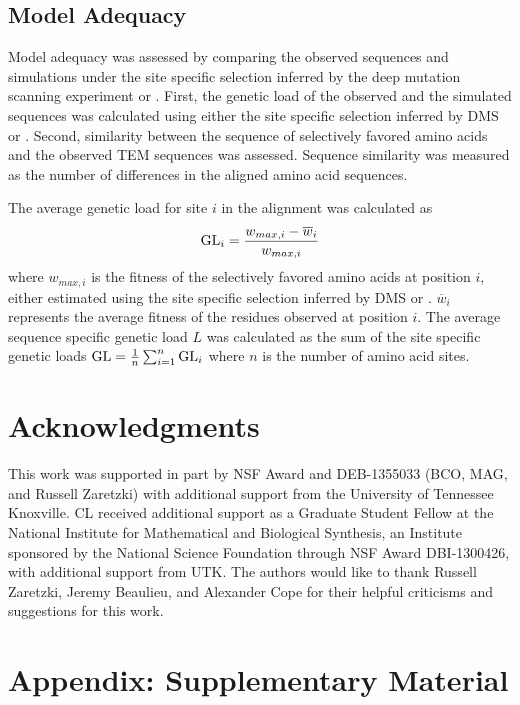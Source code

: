 \subsection{Model Adequacy}

Model adequacy was assessed by comparing the observed sequences and simulations under the site specific selection inferred by the deep mutation scanning experiment or \selac.
First, the genetic load of the observed and the simulated sequences was calculated using either the site specific selection inferred by DMS or \selac.
Second, similarity between the sequence of selectively favored amino acids and the observed TEM sequences was assessed.
Sequence similarity was measured as the number of differences in the aligned amino acid sequences.

The average genetic load for site $i$ in the alignment was calculated as
\begin{equation}
\text{GL}_i = \frac{w_{max,i} - \overline{w}_i}{w_{max,i}}
\end{equation}
where $w_{max,i}$ is the fitness of the selectively favored amino acids at position $i$, either estimated using the site specific selection inferred by DMS or \selac.
$\overline{w}_i$ represents the average fitness of the residues observed at position $i$.
The average sequence specific genetic load $L$ was calculated as the sum of the site specific genetic loads $\text{GL} = \frac{1}{n}\sum_{i=1}^n \text{GL}_i$ where $n$ is the number of amino acid sites.

\section{Acknowledgments}
This work was supported in part by NSF Award and DEB-1355033 (BCO, MAG, and Russell Zaretzki) with additional support from the University of Tennessee Knoxville. 
CL received additional support as a Graduate Student Fellow at the National Institute for Mathematical and Biological Synthesis, an Institute sponsored by the National Science Foundation through NSF Award DBI-1300426, with additional support from UTK. 
The authors would like to thank Russell Zaretzki, Jeremy Beaulieu, and Alexander Cope for their helpful criticisms and suggestions for this work.

\clearpage

\section{Appendix: Supplementary Material}

